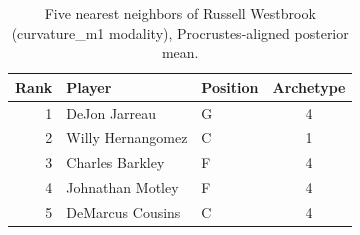 \begin{table}[htbp]
  \centering\small
  \begin{tabular}{rllc}
    \toprule
    Rank & Player & Position & Archetype \\
    \midrule
    1 & DeJon Jarreau & G & 4 \\
    2 & Willy Hernangomez & C & 1 \\
    3 & Charles Barkley & F & 4 \\
    4 & Johnathan Motley & F & 4 \\
    5 & DeMarcus Cousins & C & 4 \\
    \bottomrule
  \end{tabular}
  \caption{Five nearest neighbors of Russell Westbrook (curvature_m1 modality), Procrustes-aligned posterior mean.}
  \label{tab:Russell_Westbrook_neighbors_curvature_m1}
\end{table}

